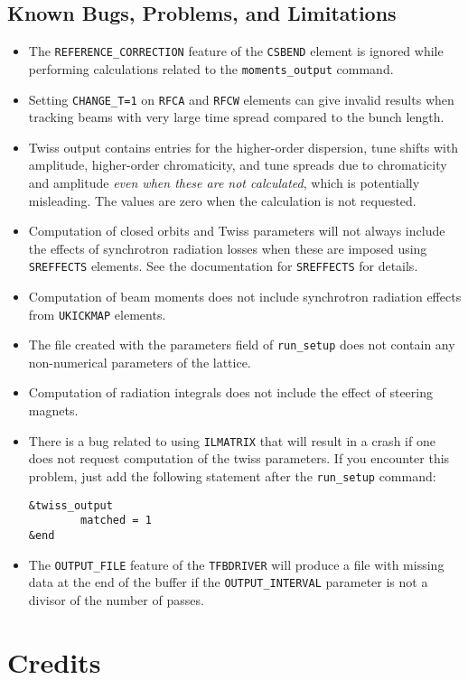 \documentclass[11pt]{article}
\begin{document}
\subsection{Known Bugs, Problems, and Limitations}
\begin{itemize}
\item The \verb|REFERENCE_CORRECTION| feature of the \verb|CSBEND| element is ignored while performing calculations related
  to the \verb|moments_output| command.
\item Setting \verb|CHANGE_T=1| on \verb|RFCA| and \verb|RFCW| elements can give invalid results when tracking beams with very 
  large time spread compared to the bunch length.
\item Twiss output contains entries for the higher-order dispersion, tune shifts with amplitude, higher-order chromaticity, and tune spreads
  due to chromaticity and amplitude {\em even when these are not calculated}, which is potentially
  misleading.   The values are zero when the calculation is not requested.
\item Computation of closed orbits and Twiss parameters will not always include the effects of synchrotron
  radiation losses when these are imposed using {\tt SREFFECTS} elements.  See
  the documentation for {\tt SREFFECTS} for details.
\item Computation of beam moments does not include synchrotron radiation effects from \verb|UKICKMAP| elements.
\item The file created with the parameters field of \verb|run_setup| does not contain
  any non-numerical parameters of the lattice.
\item Computation of radiation integrals does not include the effect of steering magnets.
\item There is a bug related to using {\tt ILMATRIX} that will result in a crash
  if one does not request computation of the twiss parameters. If you encounter this
  problem, just add the following statement after the \verb|run_setup| command:
\begin{verbatim}
&twiss_output
        matched = 1
&end
\end{verbatim}
\item The \verb|OUTPUT_FILE| feature of the \verb|TFBDRIVER| will produce a file with missing data at the end of
  the buffer if the \verb|OUTPUT_INTERVAL| parameter is not a divisor of the number of passes.
\end{itemize}

\section{Credits}
\end{document}
